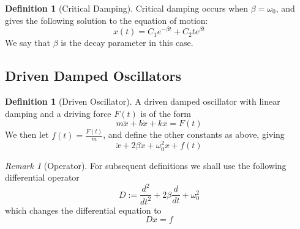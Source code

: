 \documentclass[12pt]{article}
\theoremstyle{definition}
\newtheorem{defn}[thm]{Definition}
\theoremstyle{remark}
\newtheorem{rmk}[thm]{Remark}
\numberwithin{equation}{section}
\begin{document}
\vspace{15pt}


\begin{defn}[Critical Damping]
        Critical damping occurs when $\beta = \omega_0$, and gives the following solution to the equation of motion: \begin{equation}
                x(t) = C_1e^{-\beta t} + C_2te^{\beta t}
        \end{equation}
        We say that $\beta$ is the decay parameter in this case.
\end{defn}

\vspace{15pt}


\subsection{Driven Damped Oscillators}


\begin{defn}[Driven Oscillator]
        A driven damped oscillator with linear damping and a driving force $F(t)$ is of the form \begin{equation}
                m\ddot{x} + b\dot{x} + kx = F(t)
        \end{equation}
        We then let $f(t) = \frac{F(t)}{m}$, and define the other constants as above, giving \begin{equation}
                \ddot{x} + 2\beta\dot{x} + \omega_0^2x + f(t)
        \end{equation}
\end{defn}

\vspace{15pt}


\begin{rmk}[Operator]
        For subsequent definitions we shall use the following differential operator \begin{equation}
                D := \frac{d^2}{dt^2} + 2\beta\frac{d}{dt}+\omega_0^2
        \end{equation}
        which changes the differential equation to \begin{equation}
                Dx = f
        \end{equation}
\end{rmk}

\vspace{15pt}
\end{document}
